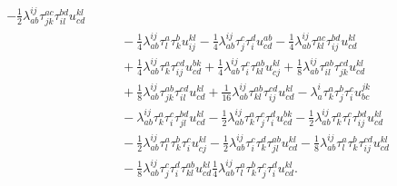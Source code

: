 \begin{equation}
\begin{aligned}
    - \frac{1}{2}\lambda^{ij}_{ab} \tau^{ac}_{jk} \tau^{bd}_{il} u^{kl}_{cd}
    \\
    &\qquad
    - \frac{1}{4}\lambda^{ij}_{ab} \tau^{a}_{l} \tau^{b}_{k} u^{kl}_{ij}
    - \frac{1}{4}\lambda^{ij}_{ab} \tau^{c}_{j} \tau^{d}_{i} u^{ab}_{cd}
    - \frac{1}{4}\lambda^{ij}_{ab} \tau^{ac}_{kl} \tau^{bd}_{ij} u^{kl}_{cd}
    \\
    &\qquad
    + \frac{1}{4}\lambda^{ij}_{ab} \tau^{a}_{k} \tau^{cd}_{ij} u^{bk}_{cd}
    + \frac{1}{4}\lambda^{ij}_{ab} \tau^{c}_{i} \tau^{ab}_{kl} u^{kl}_{cj}
    + \frac{1}{8}\lambda^{ij}_{ab} \tau^{ab}_{il} \tau^{cd}_{jk} u^{kl}_{cd}
    \\
    &\qquad
    + \frac{1}{8}\lambda^{ij}_{ab} \tau^{ab}_{jk} \tau^{cd}_{il} u^{kl}_{cd}
    + \frac{1}{16}\lambda^{ij}_{ab} \tau^{ab}_{kl} \tau^{cd}_{ij} u^{kl}_{cd}
    - \lambda^{i}_{a} \tau^{a}_{k} \tau^{b}_{j} \tau^{c}_{i} u^{jk}_{bc}
    \\
    &\qquad
    - \lambda^{ij}_{ab} \tau^{a}_{k} \tau^{c}_{i} \tau^{bd}_{jl} u^{kl}_{cd}
    - \frac{1}{2}\lambda^{ij}_{ab} \tau^{a}_{k} \tau^{c}_{j} \tau^{d}_{i} u^{bk}_{cd}
    - \frac{1}{2}\lambda^{ij}_{ab} \tau^{a}_{k} \tau^{c}_{l} \tau^{bd}_{ij} u^{kl}_{cd}
      \\
    &\qquad
    - \frac{1}{2}\lambda^{ij}_{ab} \tau^{a}_{l} \tau^{b}_{k} \tau^{c}_{i} u^{kl}_{cj}
    - \frac{1}{2}\lambda^{ij}_{ab} \tau^{c}_{i} \tau^{d}_{k} \tau^{ab}_{jl} u^{kl}_{cd}
    - \frac{1}{8}\lambda^{ij}_{ab} \tau^{a}_{l} \tau^{b}_{k} \tau^{cd}_{ij} u^{kl}_{cd}
    \\
    &\qquad
    - \frac{1}{8}\lambda^{ij}_{ab} \tau^{c}_{j} \tau^{d}_{i} \tau^{ab}_{kl} u^{kl}_{cd}
    \frac{1}{4}\lambda^{ij}_{ab} \tau^{a}_{l} \tau^{b}_{k}
    \tau^{c}_{j} \tau^{d}_{i} u^{kl}_{cd}.
    \end{aligned}
\end{equation}
